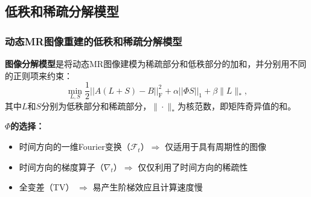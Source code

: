 \documentclass{beamer}
\begin{document}
\subsection{低秩和稀疏分解模型}
%	
%
%

\begin{frame}
	\frametitle{动态MR图像重建的低秩和稀疏分解模型}
	\textbf{图像分解模型}是将动态MR图像建模为稀疏部分和低秩部分的加和，并分别用不同的正则项来约束：
    \begin{equation}
    	\min_{L,S}\frac{1}{2}||A(L+S)-B||_\mathrm{F}^2 + \alpha||\Phi S||_1 + \beta\|L\|_*,
    \end{equation}
     其中$L$和$S$分别为低秩部分和稀疏部分，$\|\cdot\|_*$为核范数，即矩阵奇异值的和。
     
     \textbf{$\Phi$的选择：}
     \begin{itemize}
     	\item 时间方向的一维Fourier变换（$\mathcal{F}_t$）$\Rightarrow$ 仅适用于具有周期性的图像
     	\item 时间方向的梯度算子（$\nabla_t$）$\Rightarrow$ 仅仅利用了时间方向的稀疏性
     	\item 全变差（TV） $\Rightarrow$ 易产生阶梯效应且计算速度慢
     \end{itemize}
\end{frame}
\end{document}
